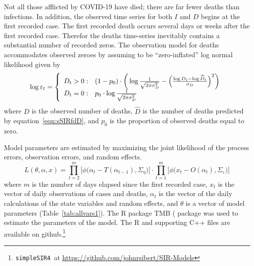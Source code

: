\documentclass[12pt,letterpaper]{article}
\newcommand\SSm{{\tt simpleSIR4}}
\begin{document}
Not all those afflicted by COVID-19 have died; there are far fewer
deaths than infections. In addition,
the observed time series for both $I$ and $D$ begins at the first recorded
case. The first recorded death occurs several days or weeks after the
first recorded case. 
Therefor the deaths time-series inevitably contains a
substantial number of recorded zeros. 
The observation model for deaths accommodates observed zeroes by
assuming to be ``zero-inflated'' log normal likelihood given by
\begin{equation}
\label{eqn:ZIlogNlike}
  \log \varepsilon_t = \left\{
    \begin{array}{r@{\;:\quad}l}
       D_t > 0 &
(1-p_0)\cdot\bigg(\log\frac{1}{\sqrt{2\pi\sigma^2_D}}
          -\Bigl(\frac{\log D_t-\log\widehat{D}_t}{\sigma_D}\Bigr)^2\bigg)\\
       D_t = 0 & p_0 \cdot\log \frac{1}{\sqrt{2\pi\sigma^2_D}}\\
    \end{array}
  \right.
\end{equation}
where $D$ is the observed number of deaths,
$\widehat{D}$ is the number of deaths predicted by
equation~\ref{eqn:sSIRfdD}, 
and $p_0$ is the proportion of observed deaths equal to zero.


Model parameters are estimated by
maximizing the joint likelihood of the process errors, observation
errors, and random effects.
\begin{equation}
\label{eqn:likelihood}
L(\theta,\alpha,x)=
\prod^m_{t=2}\big[\phi\big(\alpha_t-T(\alpha_{t-1}), \Sigma_\eta\big)\big]\cdot
\prod^m_{t=1}\big[\phi\big(x_t-O(\alpha_t),
\Sigma_\varepsilon\big)\big]
\end{equation}
where $m$ is the number of days elapsed since the first recorded case,
$x_t$ is the vector of daily observations of cases and deaths,
$\alpha_t$ is the vector of the daily calculations of the state
variables and random effects,
and $\theta$ 
is a vector of model parameters (Table~\ref{tab:allvars1}).
The R package TMB (\cite{TMB0000} package was used to 
estimate the parameters of the model. 
The R and supporting C++ files are available on 
github.\footnote{\SSm~at \url{https://github.com/johnrsibert/SIR-Models}}
\end{document}
